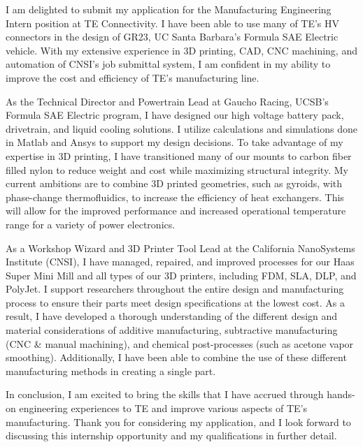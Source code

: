 \documentclass[11pt, letterpaper]{awesome-cv} %
\begin{document}
\makecvheader %

\makelettertitle %


\begin{cvletter}


I am delighted to submit my application for the Manufacturing Engineering Intern position at TE Connectivity. I have been able to use many of TE's HV connectors in the design of GR23, UC Santa Barbara's Formula SAE Electric vehicle. With my extensive experience in 3D printing, CAD, CNC machining, and automation of CNSI's job submittal system, I am confident in my ability to improve the cost and efficiency of TE's manufacturing line.

As the Technical Director and Powertrain Lead at Gaucho Racing, UCSB's Formula SAE Electric program, I have designed our high voltage battery pack, drivetrain, and liquid cooling solutions. I utilize calculations and simulations done in Matlab and Ansys to support my design decisions. To take advantage of my expertise in 3D printing, I have transitioned many of our mounts to carbon fiber filled nylon to reduce weight and cost while maximizing structural integrity. My current ambitions are to combine 3D printed geometries, such as gyroids, with phase-change thermofluidics, to increase the efficiency of heat exchangers. This will allow for the improved performance and increased operational temperature range for a variety of power electronics.

As a Workshop Wizard and 3D Printer Tool Lead at the California NanoSystems Institute (CNSI), I have managed, repaired, and improved processes for our Haas Super Mini Mill and all types of our 3D printers, including FDM, SLA, DLP, and PolyJet. I support researchers throughout the entire design and manufacturing process to ensure their parts meet design specifications at the lowest cost. As a result, I have developed a thorough understanding of the different design and material considerations of additive manufacturing, subtractive manufacturing (CNC \& manual machining), and chemical post-processes (such as acetone vapor smoothing). Additionally, I have been able to combine the use of these different manufacturing methods in creating a single part.

In conclusion, I am excited to bring the skills that I have accrued through hands-on engineering experiences to TE and improve various aspects of TE's manufacturing. Thank you for considering my application, and I look forward to discussing this internship opportunity and my qualifications in further detail.


\end{cvletter}


\makeletterclosing %
\end{document}
